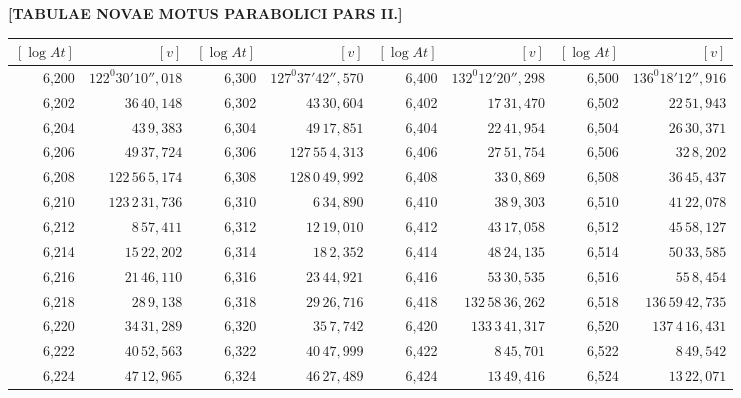 \clearpage
{}
\begingroup
\centering
\fontsize{9}{9}\selectfont
\setlength{\tabcolsep}{.2pt}
\renewcommand{\arraystretch}{.9}
\setlength{\parskip}{0pt}
\textbf{[TABULAE NOVAE MOTUS PARABOLICI PARS II.]}
\par\vspace{7pt}
\begin{tabular}{|r|r||r|r||r|r||r|r|}
\hline
\([\log At]\) & \([v]\) & \([\log At]\) & \([v]\) & \([\log At]\) & \([v]\) & \([\log At]\) & \([v]\) \\
\hline
6,200 & \(122^{0}30'10'',\!018\) & 6,300 & \(127^{0}37'42'',\!570\) & 6,400 & \(132^{0}12'20'',\!298\) & 6,500 & \(136^{0}18'12'',\!916\) \\[1pt]
6,202 & \(36\,40,\!148\) & 6,302 & \(43\,30,\!604\) & 6,402 & \(17\,31,\!470\) & 6,502 & \(22\,51,\!943\) \\
6,204 & \(43\,9,\!383\) & 6,304 & \(49\,17,\!851\) & 6,404 & \(22\,41,\!954\) & 6,504 & \(26\,30,\!371\) \\
6,206 & \(49\,37,\!724\) & 6,306 & \(127\,55\,4,\!313\) & 6,406 & \(27\,51,\!754\) & 6,506 & \(32\,8,\!202\) \\
6,208 & \(122\,56\,5,\!174\) & 6,308 & \(128\,0\,49,\!992\) & 6,408 & \(33\,0,\!869\) & 6,508 & \(36\,45,\!437\) \\
6,210 & \(123\,2\,31,\!736\) & 6,310 & \(6\,34,\!890\) & 6,410 & \(38\,9,\!303\) & 6,510 & \(41\,22,\!078\) \\[1pt]
6,212 & \(8\,57,\!411\) & 6,312 & \(12\,19,\!010\) & 6,412 & \(43\,17,\!058\) & 6,512 & \(45\,58,\!127\) \\
6,214 & \(15\,22,\!202\) & 6,314 & \(18\,2,\!352\) & 6,414 & \(48\,24,\!135\) & 6,514 & \(50\,33,\!585\) \\
6,216 & \(21\,46,\!110\) & 6,316 & \(23\,44,\!921\) & 6,416 & \(53\,30,\!535\) & 6,516 & \(55\,8,\!454\) \\
6,218 & \(28\,9,\!138\) & 6,318 & \(29\,26,\!716\) & 6,418 & \(132\,58\,36,\!262\) & 6,518 & \(136\,59\,42,\!735\) \\
6,220 & \(34\,31,\!289\) & 6,320 & \(35\,7,\!742\) & 6,420 & \(133\,3\,41,\!317\) & 6,520 & \(137\,4\,16,\!431\) \\[1pt]
6,222 & \(40\,52,\!563\) & 6,322 & \(40\,47,\!999\) & 6,422 & \(8\,45,\!701\) & 6,522 & \(8\,49,\!542\) \\
6,224 & \(47\,12,\!965\) & 6,324 & \(46\,27,\!489\) & 6,424 & \(13\,49,\!416\) & 6,524 & \(13\,22,\!071\) \\

\end{tabular}
